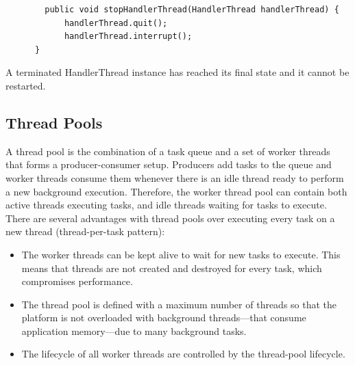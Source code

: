 \begin{itemize}
	\begin{lstlisting}
		public void stopHandlerThread(HandlerThread handlerThread) {
			handlerThread.quit();
			handlerThread.interrupt();
	  }
	\end{lstlisting}
	A terminated HandlerThread instance has reached its final state and it cannot be restarted.
\end{itemize}

\subsection{Thread Pools}
A thread pool is the combination of a task queue and a set of worker threads that forms a producer-consumer setup. Producers add tasks to the queue and worker threads consume them whenever there is an idle thread ready to perform a new background execution. Therefore, the worker thread pool can contain both active threads executing tasks, and idle threads waiting for tasks to execute.
There are several advantages with thread pools over executing every task on a new thread (thread-per-task pattern):
\begin{itemize}
	\item The worker threads can be kept alive to wait for new tasks to execute. This means that threads are not created and destroyed for every task, which compromises performance.
	\item The thread pool is defined with a maximum number of threads so that the platform is not overloaded with background threads—that consume application memory—due to many background tasks.
	\item The lifecycle of all worker threads are controlled by the thread-pool lifecycle.
\end{itemize}

